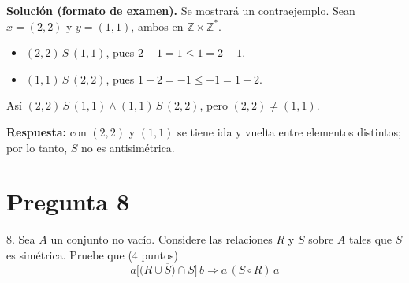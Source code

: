 \documentclass[11pt]{article}
\begin{document}
\textbf{Solución (formato de examen).} Se mostrará un contraejemplo. Sean $x=(2,2)$ y $y=(1,1)$, ambos en $\mathbb Z\times\mathbb Z^*$.
\begin{itemize}[leftmargin=1.2em]
\item $(2,2)\,S\,(1,1)$, pues $2-1=1\le 1=2-1$.
\item $(1,1)\,S\,(2,2)$, pues $1-2=-1\le -1=1-2$.
\end{itemize}
Así $(2,2)\,S\,(1,1)\wedge(1,1)\,S\,(2,2)$, pero $(2,2)\neq(1,1)$.

\textbf{Respuesta:} con $(2,2)$ y $(1,1)$ se tiene ida y vuelta entre elementos distintos; por lo tanto, $S$ no es antisimétrica.

\clearpage
\section*{Pregunta 8}

8. Sea $A$ un conjunto no vacío. Considere las relaciones $R$ y $S$ sobre $A$ tales que \colorbox{green!35}{$S$ es simétrica}. Pruebe que \hfill (4 puntos)
\[a\big[\big(R\cup\overline S\big)\cap S\big]\,b\Longrightarrow a\,(S\circ R)\,a\]

\begin{center}
\end{center}

\end{document}
